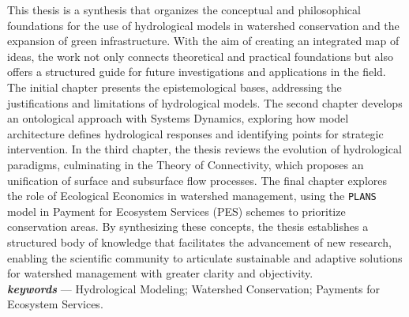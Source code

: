 \documentclass[./main.tex]{subfiles}
\begin{document}
\large
\begin{center}
    \vspace{5mm}
\end{center}
\singlespacing
\normalsize
This thesis is a synthesis that organizes the conceptual and philosophical foundations for the use of hydrological models in watershed conservation and the expansion of green infrastructure. With the aim of creating an integrated map of ideas, the work not only connects theoretical and practical foundations but also offers a structured guide for future investigations and applications in the field. The initial chapter presents the epistemological bases, addressing the justifications and limitations of hydrological models. The second chapter develops an ontological approach with Systems Dynamics, exploring how model architecture defines hydrological responses and identifying points for strategic intervention. In the third chapter, the thesis reviews the evolution of hydrological paradigms, culminating in the Theory of Connectivity, which proposes an unification of surface and subsurface flow processes. The final chapter explores the role of Ecological Economics in watershed management, using the \texttt{PLANS} model in Payment for Ecosystem Services (PES) schemes to prioritize conservation areas. By synthesizing these concepts, the thesis establishes a structured body of knowledge that facilitates the advancement of new research, enabling the scientific community to articulate sustainable and adaptive solutions for watershed management with greater clarity and objectivity.\\[2ex]
	
\noindent \textit{\textbf{keywords}} --- Hydrological Modeling; Watershed Conservation; Payments for Ecosystem Services.

\clearpage
\end{document}
